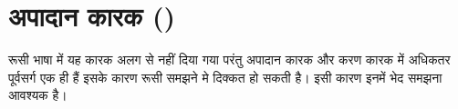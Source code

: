 \section{अपादान कारक ()} \label{sec:case-ablative}
रूसी भाषा में यह कारक अलग से नहीं दिया गया परंतु अपादान कारक और करण कारक में अधिकतर पूर्वसर्ग एक ही हैं इसके कारण रूसी समझने मे दिक्कत हो सकती है। इसी
कारण इनमें भेद समझना आवश्यक है।
